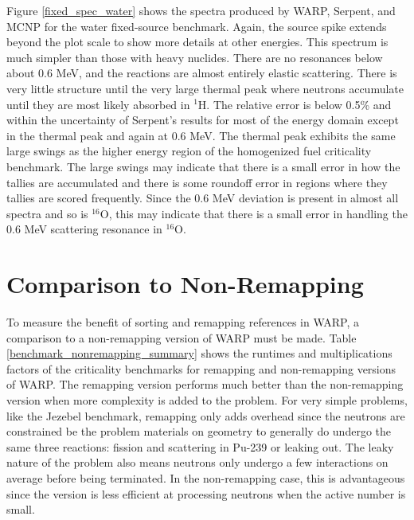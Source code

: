 Figure \ref{fixed_spec_water} shows the spectra produced by WARP, Serpent, and MCNP for the water fixed-source benchmark.  Again, the source spike extends beyond the plot scale to show more details at other energies.  This spectrum is much simpler than those with heavy nuclides.  There are no resonances below about 0.6 MeV, and the reactions are almost entirely elastic scattering.  There is very little structure until the very large thermal peak where neutrons accumulate until they are most likely absorbed in $^1$H.  The relative error is below 0.5\% and within the uncertainty of Serpent's results for most of the energy domain except in the thermal peak and again at 0.6 MeV.  The thermal peak exhibits the same large swings as the higher energy region of the homogenized fuel criticality benchmark.  The large swings may indicate that there is a small error in how the tallies are accumulated and there is some roundoff error in regions where they tallies are scored frequently.   Since the 0.6 MeV deviation is present in almost all spectra and so is $^{16}$O, this may indicate that there is a small error in handling the 0.6 MeV scattering resonance in $^{16}$O.  


\section{Comparison to Non-Remapping}

To measure the benefit of sorting and remapping references in WARP, a comparison to a non-remapping version of WARP must be made.  Table \ref{benchmark_nonremapping_summary} shows the runtimes and multiplications factors of the criticality benchmarks for remapping and non-remapping versions of WARP.  The remapping version performs much better than the non-remapping version when more complexity is added to the problem.  For very simple problems, like the Jezebel benchmark, remapping only adds overhead since the neutrons are constrained be the problem materials on geometry to generally do undergo the same three reactions: fission and scattering in Pu-239 or leaking out.  The leaky nature of the problem also means neutrons only undergo a few interactions on average before being terminated.  In the non-remapping case, this is advantageous since the version is less efficient at processing neutrons when the active number is small.

